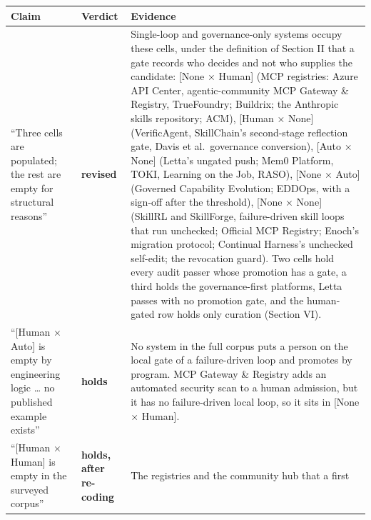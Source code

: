 \documentclass[
]{article}
\newcounter{none} %
\begin{document}
{\def\LTcaptype{none} %
\begin{longtable}[]{@{}
  >{\raggedright\arraybackslash}p{}
  >{\raggedright\arraybackslash}p{}
  >{\raggedright\arraybackslash}p{}@{}}
\toprule\noalign{}
\begin{minipage}[b]{\linewidth}\raggedright
Claim
\end{minipage} & \begin{minipage}[b]{\linewidth}\raggedright
Verdict
\end{minipage} & \begin{minipage}[b]{\linewidth}\raggedright
Evidence
\end{minipage} \\
\midrule\noalign{}
\endhead
\bottomrule\noalign{}
\endlastfoot
``Three cells are populated; the rest are empty for structural reasons''
& \textbf{revised} & Single-loop and governance-only systems occupy
these cells, under the definition of Section II that a gate records who
decides and not who supplies the candidate: {[}None × Human{]} (MCP
registries: Azure API Center, agentic-community MCP Gateway \& Registry,
TrueFoundry; Buildrix; the Anthropic skills repository; ACM), {[}Human ×
None{]} (VerificAgent, SkillChain's second-stage reflection gate, Davis
et al.~governance conversion), {[}Auto × None{]} (Letta's ungated push;
Mem0 Platform, TOKI, Learning on the Job, RASO), {[}None × Auto{]}
(Governed Capability Evolution; EDDOps, with a sign-off after the
threshold), {[}None × None{]} (SkillRL and SkillForge, failure-driven
skill loops that run unchecked; Official MCP Registry; Enoch's migration
protocol; Continual Harness's unchecked self-edit; the revocation
guard). Two cells hold every audit passer whose promotion has a gate, a
third holds the governance-first platforms, Letta passes with no
promotion gate, and the human-gated row holds only curation (Section
VI). \\
``{[}Human × Auto{]} is empty by engineering logic \ldots{} no published
example exists'' & \textbf{holds} & No system in the full corpus puts a
person on the local gate of a failure-driven loop and promotes by
program. MCP Gateway \& Registry adds an automated security scan to a
human admission, but it has no failure-driven local loop, so it sits in
{[}None × Human{]}. \\
``{[}Human × Human{]} is empty in the surveyed corpus'' & \textbf{holds,
after re-coding} & The registries and the community hub that a first

\end{longtable}}
\end{document}
